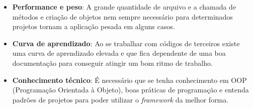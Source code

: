         \begin{itemize}
            \item \textbf{Performance e peso}: A grande quantidade de arquivo e a chamada de métodos e criação de objetos nem sempre necessário para determinados projetos tornam a aplicação pesada em alguns casos.

            \item \textbf{Curva de aprendizado}: Ao se trabalhar com códigos de terceiros existe uma curva de aprendizado elevada e que fica dependente de uma boa documentação para conseguir atingir um bom ritmo de trabalho.

            \item \textbf{Conhecimento técnico}: É necessário que se tenha conhecimento em OOP (Programação Orientada à Objeto), boas práticas de programação e entenda padrões de projetos para poder utilizar o \emph{framework} da melhor forma.

        \end{itemize}

